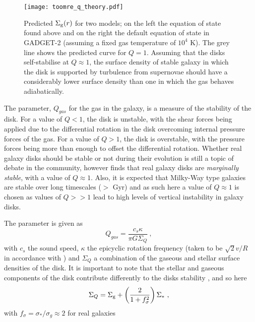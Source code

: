 \begin{figure}
    \centering
    \texttt{[image: toomre\_q\_theory.pdf]}
    \caption{Predicted $\Sigma_\mathrm{g}(r)$ for two models; on the left the equation of state found above and on the right the default equation of state in GADGET-2 (assuming a fixed gas temperature of $10^4$ K). The grey line shows the predicted curve for $Q=1$. Assuming that the disks self-stabilise at $Q\approx1$, the surface density of stable galaxy in which the disk is supported by turbulence from supernovae should have a considerably lower surface density than one in which the gas behaves adiabatically.}
    \label{fig:toomreqthr}
\end{figure}

The \citet{toomre_on_1964} parameter, $Q_{gas}$ for the gas in the galaxy, is a measure of the stability of the disk.
For a value of $Q<1$, the disk is unstable, with the shear forces being applied due to the differential rotation in the disk overcoming internal pressure forces of the gas.
For a value of $Q>1$, the disk is overstable, with the pressure forces being more than enough to offset the differential rotation.
Whether real galaxy disks should be stable or not during their evolution is still a topic of debate in the community, however \citet{SOMEBODY} finds that real galaxy disks are \emph{marginally stable}, with a value of $Q \approx 1$.
Also, it is expected that Milky-Way type galaxies are stable over long timescales ($>$ Gyr) and as such here a value of $Q \approx 1$ is chosen as values of $Q >> 1$ lead to high levels of vertical instability in galaxy disks.

The \citet{toomre1964} parameter is given as
\begin{equation}
    Q_{gas} = \frac{c_s \kappa}{\pi G \Sigma_Q}~,
    \label{eqn:Q}
\end{equation}
with $c_s$ the sound speed, $\kappa$ the epicyclic rotation frequency (taken to be $\sqrt{2} v/R$ in accordance with \citet{livermore_resolved_2015}) and $\Sigma_Q$ a combination of the gaseous and stellar surface densities of the disk.
It is important to note that the stellar and gaseous components of the disk contribute differently to the disks stability \citep{rafikov_local_2001}, and so here
\begin{equation}
    \Sigma_Q = \Sigma_\mathrm{g}  + \left(\frac{2}{1 + f_\sigma^2}\right)\Sigma_*~,
    \label{eqn:sgq}
\end{equation}
with $f_\sigma = \sigma_*/\sigma_g \approx 2$ for real galaxies \citep{korchagin_local_2003}

